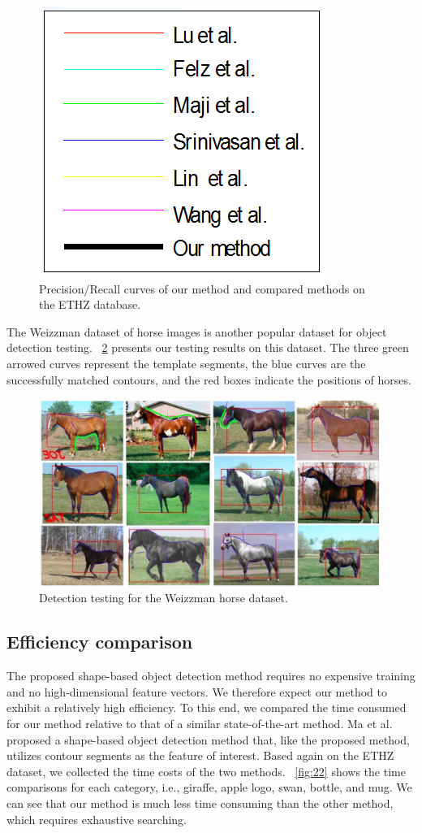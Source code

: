 \documentclass[journal]{IEEEtran}
\begin{document}
\begin{figure}[!t]
\includegraphics[width=0.4\linewidth]{images/fig17f.png}
\caption{Precision/Recall curves of our method and compared methods on the ETHZ database.}
\label{fig:17}
\end{figure}

The Weizzman dataset of horse images is another popular dataset for object detection testing. 
\figurename~\ref{fig:21} presents our testing results on this dataset. 
The three green arrowed curves represent the template segments, 
the blue curves are the successfully matched contours, and the red boxes indicate the positions of horses.

\begin{figure}[!t]
\centering
\includegraphics[width=0.95\linewidth]{images/fig21.jpg}
\caption{Detection testing for the Weizzman horse dataset.}
\label{fig:21}
\end{figure}

\subsection{Efficiency comparison}

The proposed shape-based object detection method requires no expensive training and no high-dimensional feature vectors. We therefore expect our method to exhibit a relatively high efficiency. 
To this end, we compared the time consumed for our method relative to that of a similar state-of-the-art method. 
Ma et al. \cite{ma2011} proposed a shape-based object detection method that, 
like the proposed method, utilizes contour segments as the feature of interest. 
Based again on the ETHZ dataset, we collected the time costs of the two methods.
\figurename~\ref{fig:22} shows the time comparisons for each category, 
i.e., giraffe, apple logo, swan, bottle, and mug. 
We can see that our method is much less time consuming than the other method, 
which requires exhaustive searching.
\end{document}
